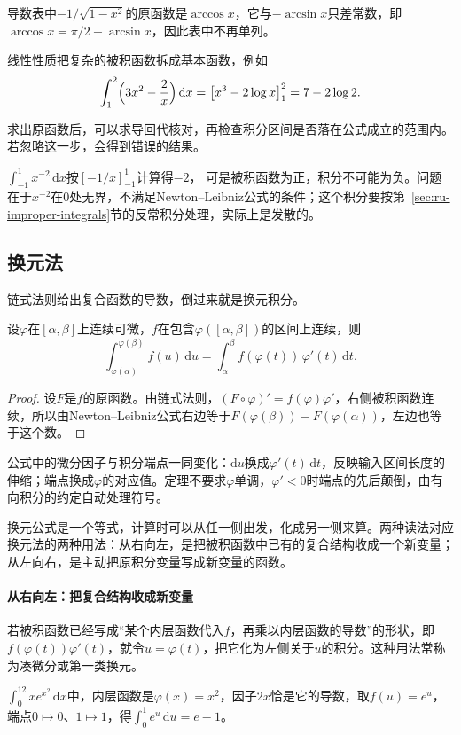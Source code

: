 导数表中$-1/\sqrt{1-x^2}$的原函数是$\arccos x$，它与$-\arcsin x$只差常数，即$\arccos x=\pi/2-\arcsin x$，因此表中不再单列。

线性性质把复杂的被积函数拆成基本函数，例如
\[
 \int_1^2\Bigl(3x^2-\frac2x\Bigr)\,\mathrm dx=\bigl[x^3-2\log x\bigr]_1^2=7-2\log2.
\]

求出原函数后，可以求导回代核对，再检查积分区间是否落在公式成立的范围内。若忽略这一步，会得到错误的结果。
\begin{example}[越过奇点套用原函数]
\label{ex:ru-ignore-singularity}
$\int_{-1}^1x^{-2}\,\mathrm dx$按$[-1/x]_{-1}^1$计算得$-2$，
可是被积函数为正，积分不可能为负。问题在于$x^{-2}$在$0$处无界，不满足Newton--Leibniz公式的条件；这个积分要按第~\ref{sec:ru-improper-integrals}节的反常积分处理，实际上是发散的。
\end{example}

\subsection{换元法}
\label{sec:ru-substitution}

链式法则给出复合函数的导数，倒过来就是换元积分。
\begin{theorem}[换元公式]
\label{thm:ru-substitution}
设$\varphi$在$[\alpha,\beta]$上连续可微，$f$在包含$\varphi([\alpha,\beta])$的区间上连续，则
\[
 \int_{\varphi(\alpha)}^{\varphi(\beta)}f(u)\,\mathrm du=\int_\alpha^\beta f(\varphi(t))\,\varphi'(t)\,\mathrm dt.
\]
\end{theorem}
\begin{proof}
设$F$是$f$的原函数。由链式法则，$(F\circ\varphi)'=f(\varphi)\varphi'$，右侧被积函数连续，所以由Newton--Leibniz公式右边等于$F(\varphi(\beta))-F(\varphi(\alpha))$，左边也等于这个数。
\end{proof}
公式中的微分因子与积分端点一同变化：$\mathrm du$换成$\varphi'(t)\,\mathrm dt$，反映输入区间长度的伸缩；端点换成$\varphi$的对应值。定理不要求$\varphi$单调，$\varphi'<0$时端点的先后颠倒，由有向积分的约定自动处理符号。

换元公式是一个等式，计算时可以从任一侧出发，化成另一侧来算。两种读法对应换元法的两种用法：从右向左，是把被积函数中已有的复合结构收成一个新变量；从左向右，是主动把原积分变量写成新变量的函数。

\paragraph{从右向左：把复合结构收成新变量}
若被积函数已经写成“某个内层函数代入$f$，再乘以内层函数的导数”的形状，即$f(\varphi(t))\varphi'(t)$，就令$u=\varphi(t)$，把它化为左侧关于$u$的积分。这种用法常称为凑微分或第一类换元。
\begin{example}
\label{ex:ru-substitution-first-kind}
$\int_0^12xe^{x^2}\,\mathrm dx$中，内层函数是$\varphi(x)=x^2$，因子$2x$恰是它的导数，取$f(u)=e^u$，端点$0\mapsto0$、$1\mapsto1$，得$\int_0^1e^u\,\mathrm du=e-1$。
\end{example}

